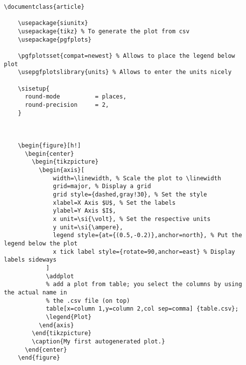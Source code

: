   \begin{lstlisting}[language={[LaTeX]TeX},breaklines=true,frame=single]
    \documentclass{article}

    \usepackage{siunitx}
    \usepackage{tikz} % To generate the plot from csv
    \usepackage{pgfplots}

    \pgfplotsset{compat=newest} % Allows to place the legend below plot
    \usepgfplotslibrary{units} % Allows to enter the units nicely

    \sisetup{
      round-mode          = places,
      round-precision     = 2,
    }

    

    \begin{figure}[h!]
      \begin{center}
        \begin{tikzpicture}
          \begin{axis}[
              width=\linewidth, % Scale the plot to \linewidth
              grid=major, % Display a grid
              grid style={dashed,gray!30}, % Set the style
              xlabel=X Axis $U$, % Set the labels
              ylabel=Y Axis $I$,
              x unit=\si{\volt}, % Set the respective units
              y unit=\si{\ampere},
              legend style={at={(0.5,-0.2)},anchor=north}, % Put the legend below the plot
              x tick label style={rotate=90,anchor=east} % Display labels sideways
            ]
            \addplot 
            % add a plot from table; you select the columns by using the actual name in
            % the .csv file (on top)
            table[x=column 1,y=column 2,col sep=comma] {table.csv}; 
            \legend{Plot}
          \end{axis}
        \end{tikzpicture}
        \caption{My first autogenerated plot.}
      \end{center}
    \end{figure}

    
  \end{lstlisting}

